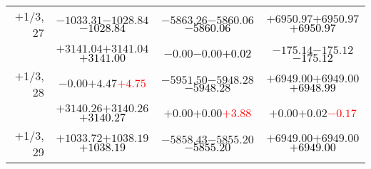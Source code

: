 \documentclass[compress]{beamer}
\begin{document}
\begin{frame}
{\begin{tabular}{r | c | c | c}
$+$1/3, 27 & $-1033.31$\hspace{0.1 cm}$-1028.84$\hspace{0.1 cm}\textcolor{black}{$-1028.84$} & $-5863.26$\hspace{0.1 cm}$-5860.06$\hspace{0.1 cm}\textcolor{black}{$-5860.06$} & $+6950.97$\hspace{0.1 cm}$+6950.97$\hspace{0.1 cm}\textcolor{black}{$+6950.97$} \\
           & $+3141.04$\hspace{0.1 cm}$+3141.04$\hspace{0.1 cm}\textcolor{black}{$+3141.00$} & $-0.00$\hspace{0.1 cm}$-0.00$\hspace{0.1 cm}\textcolor{black}{$+0.02$} & $-175.14$\hspace{0.1 cm}$-175.12$\hspace{0.1 cm}\textcolor{black}{$-175.12$} \\
$+$1/3, 28 & $-0.00$\hspace{0.1 cm}$+4.47$\hspace{0.1 cm}\textcolor{red}{$+4.75$} & $-5951.50$\hspace{0.1 cm}$-5948.28$\hspace{0.1 cm}\textcolor{black}{$-5948.28$} & $+6949.00$\hspace{0.1 cm}$+6949.00$\hspace{0.1 cm}\textcolor{black}{$+6948.99$} \\
           & $+3140.26$\hspace{0.1 cm}$+3140.26$\hspace{0.1 cm}\textcolor{black}{$+3140.27$} & $+0.00$\hspace{0.1 cm}$+0.00$\hspace{0.1 cm}\textcolor{red}{$+3.88$} & $+0.00$\hspace{0.1 cm}$+0.02$\hspace{0.1 cm}\textcolor{red}{$-0.17$} \\
$+$1/3, 29 & $+1033.72$\hspace{0.1 cm}$+1038.19$\hspace{0.1 cm}\textcolor{black}{$+1038.19$} & $-5858.43$\hspace{0.1 cm}$-5855.20$\hspace{0.1 cm}\textcolor{black}{$-5855.20$} & $+6949.00$\hspace{0.1 cm}$+6949.00$\hspace{0.1 cm}\textcolor{black}{$+6949.00$} \\

\end{tabular}}
\end{frame}
\end{document}
